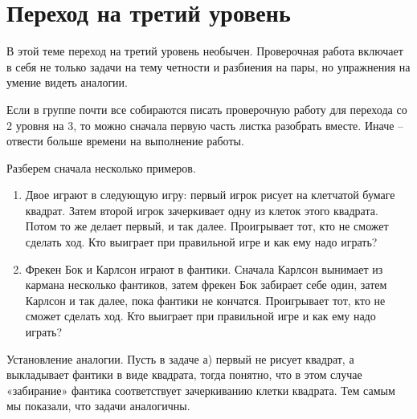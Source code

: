 \section{ Переход на третий  уровень}

В этой теме переход на третий уровень необычен. Проверочная работа включает в себя не только задачи на тему четности и разбиения на пары, но упражнения на умение видеть аналогии.

Если в группе почти все собираются писать проверочную работу для перехода со 2 уровня на 3, то можно сначала первую часть листка разобрать вместе. Иначе -- отвести больше времени на выполнение работы.

Разберем сначала несколько примеров.

\begin{enumerate}
	\item  Двое играют в следующую игру: первый игрок рисует на клетчатой бумаге квадрат. Затем второй игрок зачеркивает одну из клеток этого квадрата. Потом то же делает первый, и так далее. Проигрывает тот, кто не сможет сделать ход. Кто выиграет при правильной игре и как ему надо играть?
	
	\item  Фрекен Бок и Карлсон играют в фантики. Сначала Карлсон вынимает из кармана несколько фантиков, затем фрекен Бок забирает себе один, затем Карлсон и так далее, пока фантики не кончатся. Проигрывает тот, кто не сможет сделать ход. Кто выиграет при правильной игре и как ему надо играть?
\end{enumerate}

Установление аналогии. Пусть в задаче а) первый не рисует квадрат, а выкладывает фантики в виде квадрата, тогда понятно, что в этом случае «забирание» фантика соответствует зачеркиванию клетки квадрата. Тем самым мы показали, что задачи аналогичны.

